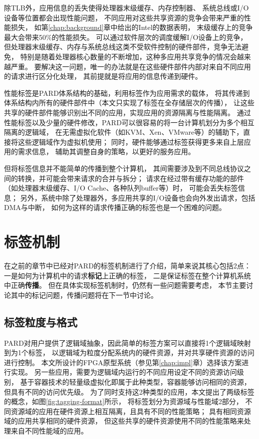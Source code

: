 除TLB外，应用信息的丢失使得处理器末级缓存、内存控制器、
系统总线或I/O设备等位置都会出现性能问题，
不同应用对这些共享资源的竞争会带来严重的性能损失，
如第\ref{chap:background}章中给出的Intel的数据表明，
末级缓存上的竞争最大会带来50\%的性能损失\cite{Christine:2014}。
可以通过软件层次的调度缓解I/O设备上的竞争，
但处理器末级缓存、内存与系统总线这类不受软件控制的硬件部件，竞争无法避免，
特别是随着处理器核心数量的不断增加，这种多应用共享竞争的情况会越来越严重。
要解决这一问题，唯一的办法就是在这些硬件部件内部对来自不同应用的请求进行区分化处理，
其前提就是将应用的信息传递到硬件。

性能标签是PARD体系结构的基础，利用标签作为应用需求的载体，
将其传递到体系结构内所有的硬件部件中（本文只实现了标签在全存储层次的传播），
让这些共享的硬件部件能够识别出不同的应用，实现应用的资源隔离与性能隔离。
通过性能标签以及少量的硬件修改，PARD可以很容易的将一台计算机划分为多个相互隔离的逻辑域，
在无需虚拟化软件（如KVM、Xen、VMware等）的辅助下，直接将这些逻辑域作为虚拟机使用；
同时，硬件能够通过标签获得更多来自上层应用的需求信息，
辅助其调整自身的策略，以更好的服务应用。

但将标签信息并不能简单的传播到整个计算机，
其间需要涉及到不同总线协议之间的转换，并可能会带来请求的合并与拆分；
请求在经过带有缓存功能的部件（如处理器末级缓存、I/O Cache、各种队列buffer等）时，
可能会丢失标签信息；
另外，系统中除了处理器外，多应用共享的I/O设备也会向外发出请求，包括DMA与中断，
如何为这样的请求传播正确的标签也是一个困难的问题。


\section{标签机制}

在之前的章节中已经对PARD的标签机制进行了介绍，简单来说其核心包括2点：
一是如何为计算机中的请求\textbf{标记}上正确的标签，
二是保证标签在整个计算机系统中正确\textbf{传播}。
但在具体实现标签机制时，仍然有一些问题需要考虑，
本节主要讨论其中的标记问题，传播问题将在下一节中讨论。


\subsection{标签粒度与格式}

PARD对用户提供了逻辑域抽象，因此简单的标签方案可以直接将1个逻辑域映射到为1个标签，
以逻辑域为粒度分配系统内的硬件资源，并对共享硬件资源的访问进行控制。
本文所设计的FPGA原型系统（参见第\ref{chap:impl}章）选择该方案进行实现。
另一些应用，需要为逻辑域内运行的不同应用设定不同的资源访问级别，
基于容器技术的轻量级虚拟化即属于此种类型，容器能够访问相同的资源，但具有不同的访问优先级。
为了同时支持这2种类型的应用，本文提出了两级标签的概念，如图\ref{fig:tagging-format}所示，
将标签划分为资源域与性能域2部分，
不同资源域的应用在硬件资源上相互隔离，且具有不同的性能策略；
具有相同资源域的应用共享相同的硬件资源，
但这些共享的硬件资源使用不同的性能策略来处理来自不同性能域的应用。

